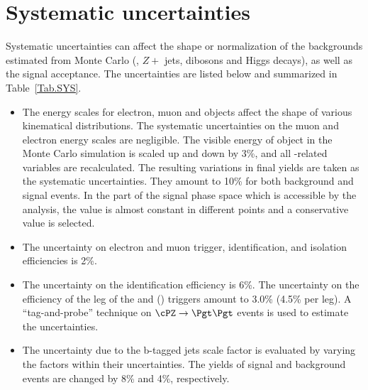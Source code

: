 \section{Systematic uncertainties}
\label{sect:sys}
Systematic uncertainties can affect the shape or normalization of the
backgrounds estimated from Monte Carlo (\ttbar, $Z+$ jets, dibosons and Higgs decays), 
as well as the signal acceptance. 
The uncertainties are listed below and summarized in Table~\ref{Tab.SYS}.


\begin{itemize}

 
\item  The energy scales for electron, muon and \Tau objects affect the shape of various kinematical distributions.
 The systematic uncertainties on the muon and electron energy scales are negligible.
The visible energy of \Tau object in the Monte Carlo simulation is scaled up and down
by 3\%, and all \Tau-related variables are recalculated. The resulting variations in
final yields are taken as the systematic uncertainties. They amount to 10\% for both
background and signal events. In the part of the signal phase space which is accessible by
the analysis, the value is almost constant in different points and a conservative value
is selected.


\item The uncertainty on electron and muon trigger, identification, and
  isolation efficiencies is 2\%.

\item The uncertainty on the \Tau identification efficiency is 6\%. 
  The uncertainty on the efficiency of the \Tau leg of the \eTau and
  \muTau (\tauTau) triggers amount to 3.0\% (4.5\% per leg).
  A ``tag-and-probe'' technique on $\cPZ\to \Pgt\Pgt$ events is used to estimate the 
  uncertainties.

\item The uncertainty due to the b-tagged jets scale factor is evaluated by varying the 
factors within their uncertainties. The yields of signal and background events are changed by 8\% 
and 4\%, respectively.
 

\end{itemize}
